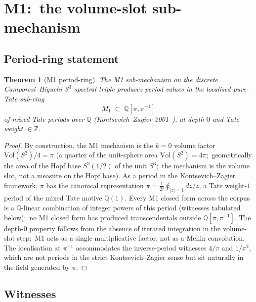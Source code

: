 \documentclass[11pt,a4paper]{article}
\theoremstyle{plain}
\newtheorem{theorem}{Theorem}[section]
\theoremstyle{definition}
\newcommand{\sthree}{S^{3}}
\newcommand{\Z}{\mathbb{Z}}
\newcommand{\Q}{\mathbb{Q}}
\newcommand{\Vol}{\mathrm{Vol}}
\begin{document}
\section{M1:\ the volume-slot sub-mechanism}
\label{sec:m1}

\subsection{Period-ring statement}

\begin{theorem}[M1 period-ring]
\label{thm:m1_pure_tate}
The M1 sub-mechanism on the discrete Camporesi--Higuchi $\sthree$
spectral triple produces period values in the localised pure-Tate
sub-ring
\begin{equation}
\label{eq:m1_ring}
M_1 \;\subset\; \Q[\pi, \pi^{-1}]
\end{equation}
of mixed-Tate periods over $\Q$ (Kontsevich--Zagier
2001~\cite{kontsevich_zagier2001}), at depth $0$ and Tate weight
$\in \Z$.
\end{theorem}

\begin{proof}
By construction, the M1 mechanism is the $k = 0$ volume factor
$\Vol(S^2)/4 = \pi$ (a quarter of the unit-sphere area $\Vol(S^2) = 4\pi$;\ geometrically the area of the Hopf base $S^2(1/2)$ of the unit $S^3$;\ the mechanism is the volume slot, not a measure on the Hopf base).  As a period in the
Kontsevich--Zagier framework, $\pi$ has the canonical representation
$\pi = \tfrac{1}{2i}\oint_{|z|=1} dz/z$, a Tate weight-$1$ period of
the mixed Tate motive $\Q(1)$.  Every M1 closed form across the
corpus is a $\Q$-linear combination of integer powers of this period
(witnesses tabulated below);\ no M1 closed form has produced
transcendentals outside $\Q[\pi, \pi^{-1}]$.  The depth-$0$
property follows from the absence of iterated integration in the
volume-slot step:\ M1 acts as a single multiplicative factor, not as
a Mellin convolution.  The localisation at $\pi^{-1}$ accommodates the
inverse-period witnesses $4/\pi$ and $1/\pi^2$, which are not
periods in the strict Kontsevich--Zagier sense but sit naturally in
the field generated by $\pi$.
\end{proof}

\subsection{Witnesses}
\end{document}
